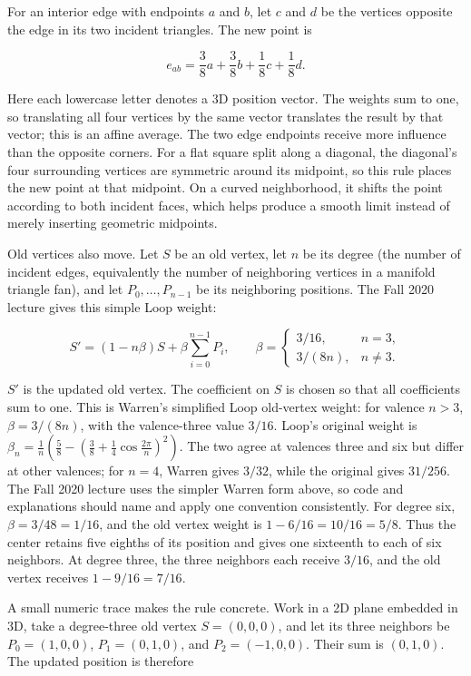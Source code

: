 For an interior edge with endpoints \(a\) and \(b\), let \(c\) and \(d\) be the vertices opposite the edge in its two incident triangles. The new point is

\[
e_{ab}=\frac{3}{8}a+\frac{3}{8}b+\frac{1}{8}c+\frac{1}{8}d.
\]

Here each lowercase letter denotes a 3D position vector. The weights sum to one, so translating all four vertices by the same vector translates the result by that vector; this is an affine average. The two edge endpoints receive more influence than the opposite corners. For a flat square split along a diagonal, the diagonal's four surrounding vertices are symmetric around its midpoint, so this rule places the new point at that midpoint. On a curved neighborhood, it shifts the point according to both incident faces, which helps produce a smooth limit instead of merely inserting geometric midpoints.

Old vertices also move. Let \(S\) be an old vertex, let \(n\) be its degree (the number of incident edges, equivalently the number of neighboring vertices in a manifold triangle fan), and let \(P_0,\ldots,P_{n-1}\) be its neighboring positions. The Fall 2020 lecture gives this simple Loop weight:

\[
S'=(1-n\beta)S+\beta\sum_{i=0}^{n-1}P_i,
\qquad
\beta=\begin{cases}
3/16,&n=3,\\
3/(8n),&n\ne3.
\end{cases}
\]

\(S'\) is the updated old vertex. The coefficient on \(S\) is chosen so that all coefficients sum to one. This is Warren's simplified Loop old-vertex weight: for valence \(n>3\), \(\beta=3/(8n)\), with the valence-three value \(3/16\). Loop's original weight is \(\beta_n=\frac1n\left(\frac58-\left(\frac38+\frac14\cos\frac{2\pi}{n}\right)^2\right)\). The two agree at valences three and six but differ at other valences; for \(n=4\), Warren gives \(3/32\), while the original gives \(31/256\). The Fall 2020 lecture uses the simpler Warren form above, so code and explanations should name and apply one convention consistently. For degree six, \(\beta=3/48=1/16\), and the old vertex weight is \(1-6/16=10/16=5/8\). Thus the center retains five eighths of its position and gives one sixteenth to each of six neighbors. At degree three, the three neighbors each receive \(3/16\), and the old vertex receives \(1-9/16=7/16\).

A small numeric trace makes the rule concrete. Work in a 2D plane embedded in 3D, take a degree-three old vertex \(S=(0,0,0)\), and let its three neighbors be \(P_0=(1,0,0)\), \(P_1=(0,1,0)\), and \(P_2=(-1,0,0)\). Their sum is \((0,1,0)\). The updated position is therefore

